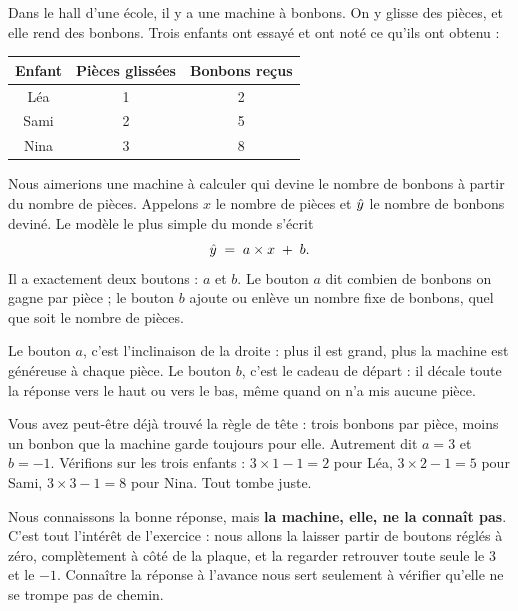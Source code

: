 \begin{exemple}
Dans le hall d'une école, il y a une machine à bonbons. On y glisse des
pièces, et elle rend des bonbons. Trois enfants ont essayé et ont noté ce
qu'ils ont obtenu :

\begin{center}
\begin{tabular}{ccc}
\toprule
\textbf{Enfant} & \textbf{Pièces glissées} & \textbf{Bonbons reçus} \\
\midrule
Léa   & 1 & 2 \\
Sami  & 2 & 5 \\
Nina  & 3 & 8 \\
\bottomrule
\end{tabular}
\end{center}

Nous aimerions une machine à calculer qui devine le nombre de bonbons à
partir du nombre de pièces. Appelons $x$ le nombre de pièces et $\hat{y}$
le nombre de bonbons deviné. Le modèle le plus simple du monde s'écrit
\[
  \hat{y} \;=\; a \times x \;+\; b .
\]
Il a exactement deux boutons : $a$ et $b$. Le bouton $a$ dit combien de
bonbons on gagne par pièce ; le bouton $b$ ajoute ou enlève un nombre fixe
de bonbons, quel que soit le nombre de pièces.
\end{exemple}

\begin{intuition}
Le bouton $a$, c'est l'inclinaison de la droite : plus il est grand, plus la
machine est généreuse à chaque pièce. Le bouton $b$, c'est le cadeau de départ : il
décale toute la réponse vers le haut ou vers le bas, même quand on n'a mis
aucune pièce.
\end{intuition}

Vous avez peut-être déjà trouvé la règle de tête : trois bonbons par pièce,
moins un bonbon que la machine garde toujours pour elle. Autrement dit
$a = 3$ et $b = -1$. Vérifions sur les trois enfants : $3 \times 1 - 1 = 2$
pour Léa, $3 \times 2 - 1 = 5$ pour Sami, $3 \times 3 - 1 = 8$ pour Nina.
Tout tombe juste.

\begin{piege}
Nous connaissons la bonne réponse, mais \textbf{la machine, elle, ne la
connaît pas}. C'est tout l'intérêt de l'exercice : nous allons la laisser
partir de boutons réglés à zéro, complètement à côté de la plaque, et la
regarder retrouver toute seule le $3$ et le $-1$. Connaître la réponse à
l'avance nous sert seulement à vérifier qu'elle ne se trompe pas de chemin.
\end{piege}

